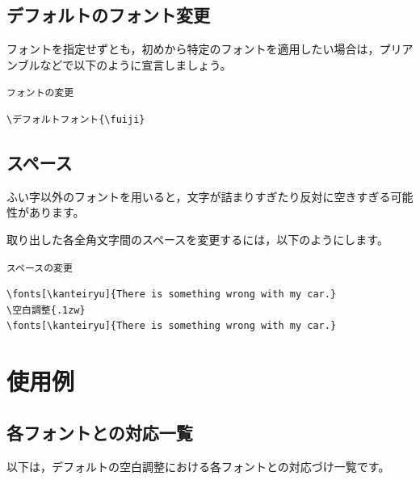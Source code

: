 \documentclass[dvipdfmx,b5j,10pt]{jsarticle}
\begin{document}
\subsection{デフォルトのフォント変更}

フォントを指定せずとも，初めから特定のフォントを適用したい場合は，プリアンブルなどで以下のように宣言しましょう。

\begin{itembox}[c]{\texttt{フォントの変更}}
\begin{verbatim}
\デフォルトフォント{\fuiji}
\end{verbatim}
\end{itembox}

\subsection{スペース}%

ふい字以外のフォントを用いると，文字が詰まりすぎたり反対に空きすぎる可能性があります。

取り出した各全角文字間のスペースを変更するには，以下のようにします。

\begin{itembox}[c]{\texttt{スペースの変更}}
\begin{verbatim}
\fonts[\kanteiryu]{There is something wrong with my car.}
\空白調整{.1zw}
\fonts[\kanteiryu]{There is something wrong with my car.}
\end{verbatim}
\end{itembox}
\begin{結果}

\end{結果}


\newpage


\section{使用例}
\subsection{各フォントとの対応一覧}

以下は，デフォルトの空白調整における各フォントとの対応づけ一覧です。
\end{document}
